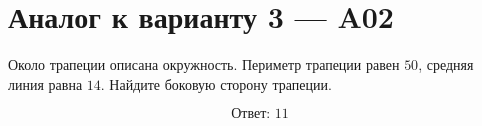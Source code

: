 \documentclass[12pt,a4paper]{article}
\begin{document}
\section*{Аналог к варианту 3 — A02}
Около трапеции описана окружность. Периметр трапеции равен \(50\), средняя линия равна \(14\). Найдите боковую сторону трапеции.
\begin{center}\figCyclicTrapezoid\end{center}
\[\boxed{\text{Ответ: }11}\]
\end{document}
